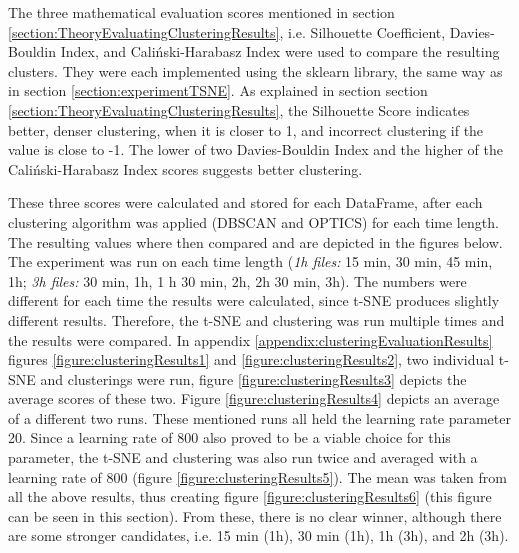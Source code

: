 


The three mathematical evaluation scores mentioned in section \ref{section:TheoryEvaluatingClusteringResults}, i.e. Silhouette Coefficient, Davies-Bouldin Index, and Caliński-Harabasz Index were used to compare the resulting clusters.  They were each implemented using the sklearn library, the same way as in section \ref{section:experimentTSNE}.
As explained in section  section \ref{section:TheoryEvaluatingClusteringResults}, the Silhouette Score indicates better, denser clustering, when it is closer to 1, and incorrect clustering if the value is close to -1. The lower of two Davies-Bouldin Index and the higher of the Caliński-Harabasz Index scores suggests better clustering.


These three scores were calculated and stored for each DataFrame, after each clustering algorithm was applied (DBSCAN and OPTICS) for each time length. The resulting values where then compared and are depicted in the figures below. 
The experiment was run on each time length (\textit{1h files:} 15 min, 30 min, 45 min, 1h; \textit{3h files:} 30 min, 1h, 1 h 30 min, 2h, 2h 30 min, 3h).
The numbers were different for each time the results were calculated, since t-SNE produces slightly different results. Therefore, the t-SNE and clustering was run multiple times and the results were compared. In appendix \ref{appendix:clusteringEvaluationResults} figures \ref{figure:clusteringResults1} and \ref{figure:clusteringResults2}, two individual t-SNE and clusterings were run, figure \ref{figure:clusteringResults3} depicts the average scores of these two. Figure \ref{figure:clusteringResults4} depicts an average of a different two runs. These mentioned runs all held the learning rate parameter 20. Since a learning rate of 800 also proved to be a viable choice for this parameter, the t-SNE and clustering was also run twice and averaged with a learning rate of 800 (figure \ref{figure:clusteringResults5}). The mean was taken from all the above results, thus creating figure \ref{figure:clusteringResults6} (this figure can be seen in this section). From these, there is no clear winner, although there are some stronger candidates, i.e. 15 min (1h), 30 min (1h), 1h (3h), and 2h (3h). 

